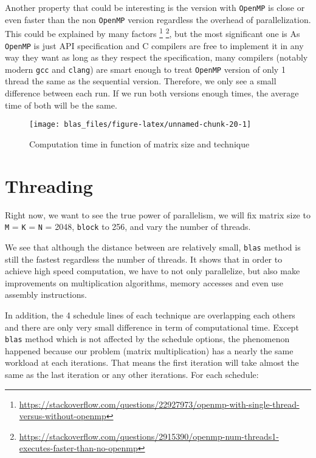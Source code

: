 \documentclass[
  12pt,
  xcolor = usenames,dvipsnames]{article}
\newcommand{\passthrough}[1]{#1}
\begin{document}
Another property that could be interesting is the version with \passthrough{\lstinline!OpenMP!} is close or even faster than the non \passthrough{\lstinline!OpenMP!} version regardless the overhead of parallelization. This could be explained by many factors \footnote{\url{https://stackoverflow.com/questions/22927973/openmp-with-single-thread-versus-without-openmp}} \footnote{\url{https://stackoverflow.com/questions/2915390/openmp-num-threads1-executes-faster-than-no-openmp}}, but the most significant one is As \passthrough{\lstinline!OpenMP!} is just API specification and C compilers are free to implement it in any way they want as long as they respect the specification, many compilers (notably modern \passthrough{\lstinline!gcc!} and \passthrough{\lstinline!clang!}) are smart enough to treat \passthrough{\lstinline!OpenMP!} version of only 1 thread the same as the sequential version. Therefore, we only see a small difference between each run. If we run both versions enough times, the average time of both will be the same.

\begin{figure}

{\centering \texttt{[image: blas\_files/figure-latex/unnamed-chunk-20-1]} 

}

\caption{Computation time in function of matrix size and technique}\label{fig:unnamed-chunk-20}
\end{figure}

\hypertarget{threading}{%
\section{Threading}\label{threading}}

Right now, we want to see the true power of parallelism, we will fix matrix size to \passthrough{\lstinline!M!} = \passthrough{\lstinline!K!} = \passthrough{\lstinline!N!} = 2048, \passthrough{\lstinline!block!} to 256, and vary the number of threads.

We see that although the distance between are relatively small, \passthrough{\lstinline!blas!} method is still the fastest regardless the number of threads. It shows that in order to achieve high speed computation, we have to not only parallelize, but also make improvements on multiplication algorithms, memory accesses and even use assembly instructions.

In addition, the 4 schedule lines of each technique are overlapping each others and there are only very small difference in term of computational time. Except \passthrough{\lstinline!blas!} method which is not affected by the schedule options, the phenomenon happened because our problem (matrix multiplication) has a nearly the same workload at each iterations. That means the first iteration will take almost the same as the last iteration or any other iterations. For each schedule:
\end{document}
